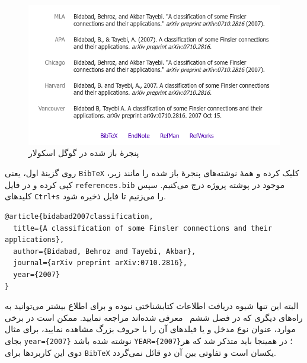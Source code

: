     \begin{figure}[h]
        \centering
        \includegraphics[width=.9\textwidth]{bibref}
        \caption{پنجره‌ٔ باز شده در گوگل اسکولار}\label{fig. 2}
    \end{figure}
    روی گزینه‌ٔ اول، یعنی    \Verb!BibTeX!    کلیک کرده و همه‌ٔ نوشته‌های پنجره‌ٔ باز شده را مانند زیر، کپی کرده و در فایل    \Verb!references.bib! 
    موجود در پوشته پروژه درج می‌کنیم. سپس کلیدهای  \Verb!Ctrl+s!    را می‌زنیم تا فایل ذخیره شود.
    \begin{latin}
    \begin{Verbatim}
@article{bidabad2007classification,
  title={A classification of some Finsler connections and their applications},
  author={Bidabad, Behroz and Tayebi, Akbar},
  journal={arXiv preprint arXiv:0710.2816},
  year={2007}
}
    \end{Verbatim}
    \end{latin}
    البته این تنها شیوه دریافت اطلاعات کتابشناختی نبوده و برای اطلاع بیشتر می‌توانید به راه‌های دیگری که در فصل ششم~\cite{razavianAmintoosiTayebi}
    معرفی شده‌اند مراجعه نمایید. 
    ممکن است در برخی موارد، عنوان نوع مدخل و یا فیلدهای آن را با حروف بزرگ مشاهده نمایید، برای مثال بجای \Verb+year={2007}+ نوشته 
    شده باشد \Verb+YEAR={2007}+؛ در همینجا باید متذکر شد که هر دوی این کاربردها برای \Verb!BibTeX! یکسان است و تفاوتی بین آن دو قائل نمی‌گردد.  
    
